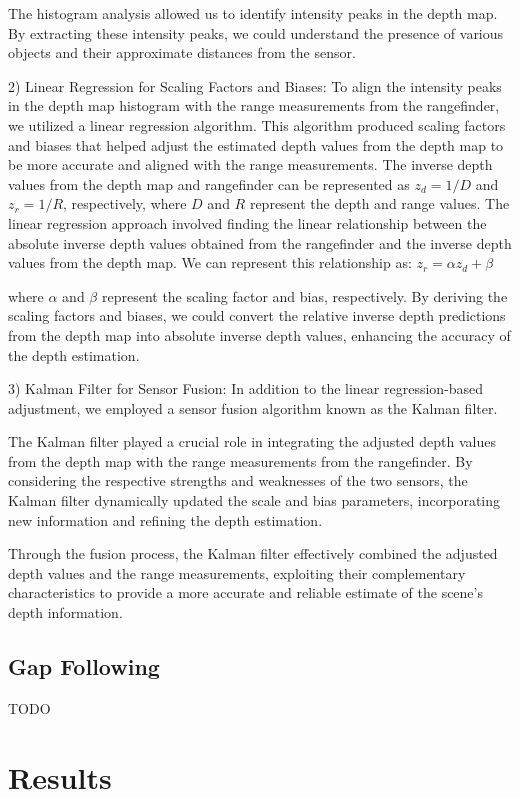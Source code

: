 \documentclass[conference]{IEEEtran}
\begin{document}
The histogram analysis allowed us to identify intensity peaks in the depth map. By extracting these intensity peaks, we could understand the presence of various objects and their approximate distances from the sensor.


2) Linear Regression for Scaling Factors and Biases:
To align the intensity peaks in the depth map histogram with the range measurements from the rangefinder, we utilized a linear regression algorithm. This algorithm produced scaling factors and biases that helped adjust the estimated depth values from the depth map to be more accurate and aligned with the range measurements.
The inverse depth values from the depth map and rangefinder can be represented as $z_{d} = 1/D$ and $z_{r} = 1/R$, respectively, where $D$ and $R$ represent the depth and range values. The linear regression approach involved finding the linear relationship between the absolute inverse depth values obtained from the rangefinder and the inverse depth values from the depth map. We can represent this relationship as:
$z_r=\alpha z_d+\beta$

where $\alpha$ and $\beta$ represent the scaling factor and bias, respectively. By deriving the scaling factors and biases, we could convert the relative inverse depth predictions from the depth map into absolute inverse depth values, enhancing the accuracy of the depth estimation.

3) Kalman Filter for Sensor Fusion:
In addition to the linear regression-based adjustment, we employed a sensor fusion algorithm known as the Kalman filter. 

The Kalman filter played a crucial role in integrating the adjusted depth values from the depth map with the range measurements from the rangefinder. By considering the respective strengths and weaknesses of the two sensors, the Kalman filter dynamically updated the scale and bias parameters, incorporating new information and refining the depth estimation.

Through the fusion process, the Kalman filter effectively combined the adjusted depth values and the range measurements, exploiting their complementary characteristics to provide a more accurate and reliable estimate of the scene's depth information.

\subsection{Gap Following}
TODO

\section{Results}
\end{document}
